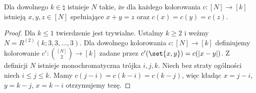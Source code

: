 \begin{theorem}[Schur]
	Dla dowolnego $k \in \natural$ istnieje $N$ takie, że dla każdego kolorowania $c: [N] \to [k]$ istnieją $x,y,z\in[N]$
	spełniające $x+y=z$ oraz $c(x)=c(y)=c(z)$.
\end{theorem}
\begin{proof}
	Dla $k \leq 1$ twierdzenie jest trywialne.
	Ustalmy $k\ge 2$ i weźmy $N = R^{(2)}(k; 3,3,\ldots,3)$. Dla dowolnego kolorowania $c: [N]\to [k]$ definiujemy
	kolorowanie $c':\binom{[N]}{2}\to [k]$ zadane przez $c'(\set{x,y}) = c(|x-y|)$. Z definicji $N$ istnieje
	monochromatyczna trójka $i,j,k$. Niech bez straty ogólności niech $i \leq j \leq k$. Mamy $c(j-i) = c(k-i) = c(k-j)$,
	więc kładąc $x=j-i$, $y=k-j$, $x=k-i$ otrzymujemy tezę.
\end{proof}

